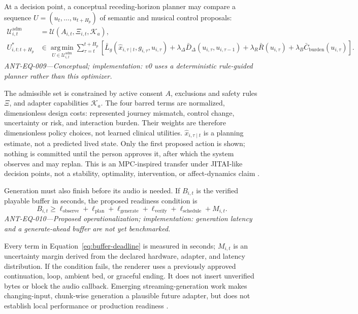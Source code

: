 At a decision point, a conceptual receding-horizon planner may compare a
sequence $U=(u_t,\ldots,u_{t+H_p})$ of semantic and musical control proposals:
\begin{equation}
  \begin{aligned}
    \mathcal{U}^{\mathrm{adm}}_{i,t}
      &= \mathcal{U}\!\left(A_{i,t},\Xi_{i,t},\mathcal{K}_a\right),\\
    U^{*}_{i,t:t+H_p}
      &\in \operatorname*{arg\,min}_{U\in\mathcal{U}^{\mathrm{adm}}_{i,t}}
      \sum_{\tau=t}^{t+H_p}
      \left[
        \bar{L}_{g}(\hat{x}_{i,\tau\mid t},g_{i,\tau},u_{i,\tau})
        +\lambda_{\Delta}\bar{D}_{\Delta}(u_{i,\tau},u_{i,\tau-1})
        +\lambda_{R}\bar{R}(u_{i,\tau})
        +\lambda_{B}\bar{C}_{\mathrm{burden}}(u_{i,\tau})
      \right].
  \end{aligned}
  \label{eq:receding-horizon}
\end{equation}
\noindent\textit{ANT-EQ-009---Conceptual; implementation: v0 uses a
deterministic rule-guided planner rather than this optimizer.}

The admissible set is constrained by active consent $A$, exclusions and safety
rules $\Xi$, and adapter capabilities $\mathcal{K}_a$. The four barred terms
are normalized, dimensionless design costs: represented journey mismatch,
control change, uncertainty or risk, and interaction burden. Their weights are
therefore dimensionless policy choices, not learned clinical utilities.
$\hat{x}_{i,\tau\mid t}$ is a planning estimate, not a predicted lived state.
Only the first proposed action is shown; nothing is committed until the person
approves it, after which the system observes and may replan. This is an
MPC-inspired transfer under JITAI-like decision points, not a stability,
optimality, intervention, or affect-dynamics claim
\citep{garcia1989mpc,nahumshani2018jitai}.

Generation must also finish before its audio is needed. If $B_{i,t}$ is the
verified playable buffer in seconds, the proposed readiness condition is
\begin{equation}
  B_{i,t} \geq
  \ell_{\mathrm{observe}}+\ell_{\mathrm{plan}}+\ell_{\mathrm{generate}}
  +\ell_{\mathrm{verify}}+\ell_{\mathrm{schedule}}+M_{i,t}.
  \label{eq:buffer-deadline}
\end{equation}
\noindent\textit{ANT-EQ-010---Proposed operationalization; implementation:
generation latency and a generate-ahead buffer are not yet benchmarked.}

Every term in Equation~\ref{eq:buffer-deadline} is measured in seconds;
$M_{i,t}$ is an uncertainty margin derived from the declared hardware,
adapter, and latency distribution. If the condition fails, the renderer uses a
previously approved continuation, loop, ambient bed, or graceful ending. It
does not insert unverified bytes or block the audio callback. Emerging
streaming-generation work makes changing-input, chunk-wise generation a
plausible future adapter, but does not establish local performance or
production readiness \citep{wang2026streaming}.

